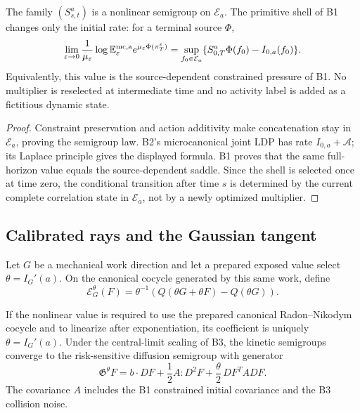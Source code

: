 \begin{theorem}
\label{thm:r3-b4-micro}
The family \((S_{s,t}^a)\) is a nonlinear semigroup on
\(\mathcal E_a\).  The primitive shell of B1 changes only the initial rate:
for a terminal source \(\Phi\),
\[
 \lim_{\varepsilon\to0}
 \frac1{\mu_\varepsilon}
 \log\mathbb E^{\rm mc,a}_\varepsilon
 e^{\mu_\varepsilon\Phi(\pi_T^\varepsilon)}
 =\sup_{f_0\in\mathcal E_a}
 \{S_{0,T}^a\Phi(f_0)-I_{0,a}(f_0)\}.
\]
Equivalently, this value is the source-dependent constrained pressure of B1.
No multiplier is reselected at intermediate time and no activity label is
added as a fictitious dynamic state.
\end{theorem}

\begin{proof}
Constraint preservation and action additivity make concatenation stay in
\(\mathcal E_a\), proving the semigroup law.  B2's microcanonical joint LDP
has rate \(I_{0,a}+\mathcal A\); its Laplace principle gives the displayed
formula.  B1 proves that the same full-horizon value equals the
source-dependent saddle.  Since the shell is selected once at time zero, the
conditional transition after time \(s\) is determined by the current complete
correlation state in \(\mathcal E_a\), not by a newly optimized multiplier.
\end{proof}

\subsection{Calibrated rays and the Gaussian tangent}

Let \(G\) be a mechanical work direction and let a prepared exposed value
select \(\theta=I_G'(a)\).  On the canonical cocycle generated by this same
work, define
\[
 \mathcal E_G^\theta(F)
 =\theta^{-1}
 \left(Q(\theta G+\theta F)-Q(\theta G)\right).
\]

\begin{theorem}
\label{thm:r3-b4-theta}
If the nonlinear value is required to use the prepared canonical
Radon--Nikodym cocycle and to linearize after exponentiation, its coefficient
is uniquely \(\theta=I_G'(a)\).  Under the central-limit scaling of B3, the
kinetic semigroups converge to the risk-sensitive diffusion semigroup with
generator
\[
 \mathfrak G^\theta F
 =b\cdot DF+\frac12A:D^2F
 +\frac\theta2\,DF^TADF.
\]
The covariance \(A\) includes the B1 constrained initial covariance and the
B3 collision noise.
\end{theorem}

